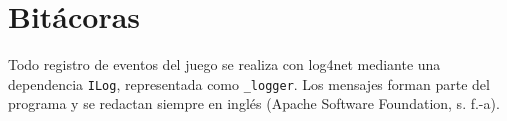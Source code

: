 \section{Bitácoras}

Todo registro de eventos del juego se realiza con log4net mediante una dependencia \texttt{ILog}, representada como \texttt{\_logger}. Los mensajes forman parte del programa y se redactan siempre en inglés (Apache Software Foundation, s. f.-a).




